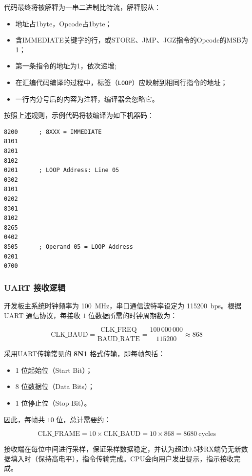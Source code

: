 \documentclass[lang=cn,a4paper,newtx]{elegantpaper}
\begin{document}
代码最终将被解释为一串二进制比特流，解释服从：
\begin{itemize}
  \item 地址占1byte，Opcode占1byte；
  \item 含IMMEDIATE关键字的行，或STORE、JMP、JGZ指令的Opcode的MSB为1；
  \item 第一条指令的地址为1，依次递增;
  \item 在汇编代码编译的过程中，标签（\texttt{LOOP}）应映射到相同行指令的地址；
  \item 一行内分号后的内容为注释，编译器会忽略它。
\end{itemize}

按照上述规则，示例代码将被编译为如下机器码：
\begin{lstlisting}[language = Assembly]
8200      ; 8XXX = IMMEDIATE
8101
8201
8102
0201      ; LOOP Address: Line 05
0302
8101
0202
8301
8102
8265
0402
8505      ; Operand 05 = LOOP Address
0201
0700
\end{lstlisting}
\subsubsection{UART 接收逻辑}

开发板主系统时钟频率为 \SI{100}{\mega\hertz}，串口通信波特率设定为 \SI{115200}{bps}。根据 UART 通信协议，每接收 $1$ 位数据所需的时钟周期数为：

\begin{equation}
  \text{CLK\_BAUD} = \frac{\text{CLK\_FREQ}}{\text{BAUD\_RATE}} = \frac{100\,000\,000}{115200} \approx 868
\end{equation}

采用UART传输常见的 \textbf{8N1} 格式传输，即每帧包括：

\begin{itemize}
  \item 1 位起始位（Start Bit）；
  \item 8 位数据位（Data Bits）；
  \item 1 位停止位（Stop Bit）。
\end{itemize}

因此，每帧共 $10$ 位，总计需要约：

\begin{equation}
  \text{CLK\_FRAME} = 10 \times \text{CLK\_BAUD} = 10 \times 868 = 8680\ \text{cycles}
\end{equation}

接收端在每位中间进行采样，保证采样数据稳定，并认为超过0.5秒RX端仍无新数据填入时（保持高电平），指令传输完成。CPU会向用户发出提示，指示接收完成。
\end{document}
